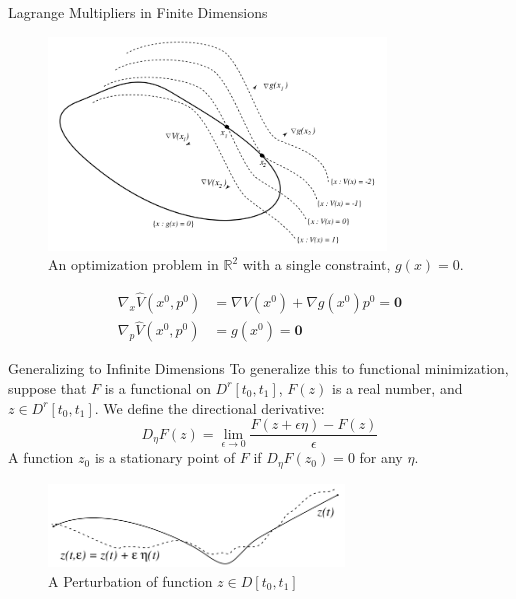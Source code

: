 \documentclass[10pt]{beamer}
\begin{document}
\begin{frame}{Lagrange Multipliers in Finite Dimensions}
  \begin{figure}
      \centering
      \includegraphics[width=0.8\textwidth]{photos/1.png}
      \caption{An optimization problem in \( \mathbb{R}^2 \) with a single constraint, $g(x)=0$.}
  \end{figure}
  \[
    \begin{aligned}
      \nabla_x \hat{V}(x^0, p^0) &= \nabla V(x^0) + \nabla g(x^0) p^0 = \mathbf{0}\\
      \nabla_p \hat{V}(x^0, p^0) &= g(x^0) = \mathbf{0}
    \end{aligned}
  \]
\end{frame}  

\begin{frame}{Generalizing to Infinite Dimensions}
  To generalize this to functional minimization, suppose that $F$ is a functional on $D^{r}[t_0,t_1]$, $F(z)$ is a real number, and $z \in D^{r}[t_0,t_1]$.
  We define the directional derivative:
  \[
    D_\eta F(z) = \lim_{\epsilon \to 0} \frac{F(z + \epsilon \eta) - F(z)}{\epsilon}
  \]
  A function \( z_0 \) is a stationary point of \( F \) if \( D_\eta F(z_0) = 0 \) for any \( \eta \).
  \begin{figure}
    \centering
    \includegraphics[width=0.7\textwidth]{photos/2.png}
    \caption{A Perturbation of function \(z\in D[t_{0},t_{1}]\)}
  \end{figure}
\end{frame}
\end{document}
